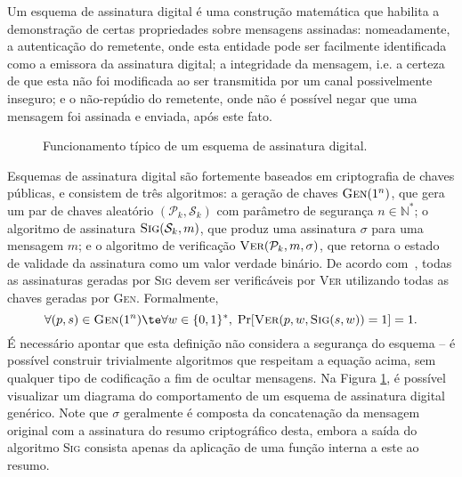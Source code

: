 \documentclass[12pt]{report}
\newcommand{\pk}{$\mathcal{P}_k$}
\newcommand{\sk}{$\mathcal{S}_k$}
\newcommand{\hash}[2][]{\mathcal{H}^{#1}(#2)}
\newcommand{\concat}{\, \vert \vert \,}
\begin{document}
Um esquema de assinatura digital é uma construção matemática que habilita a
demonstração de certas propriedades sobre mensagens assinadas: nomeadamente,
a autenticação do remetente, onde esta entidade pode ser facilmente
identificada como a emissora da assinatura digital; a integridade da mensagem,
i.e. a certeza de que esta não foi modificada ao ser transmitida por um canal
possivelmente inseguro; e o não-repúdio do remetente, onde não é possível negar
que uma mensagem foi assinada e enviada, após este fato.

\begin{figure}[ht]
  \centering
  \caption{Funcionamento típico de um esquema de assinatura digital.}
  \label{fig:2}
\end{figure}

Esquemas de assinatura digital são fortemente baseados em criptografia de
chaves públicas, e consistem de três algoritmos: a geração de chaves
$\textsc{Gen}(1^n)$, que gera um par de chaves aleatório $(\mathcal{P}_k,
\mathcal{S}_k)$ com parâmetro de segurança $n \in \mathbb{N}^{*}$; o algoritmo de assinatura
$\textsc{Sig}(\mathcal{S}_k, m)$, que produz uma assinatura $\sigma$ para uma
mensagem $m$; e o algoritmo de verificação $\textsc{Ver}(\mathcal{P}_k, m,
\sigma)$, que retorna o estado de validade da assinatura como um valor verdade
binário. De acordo com~\cite{Goldreich:2004:FCV:975541}, todas as assinaturas geradas por
\textsc{Sig} devem ser verificáveis por \textsc{Ver} utilizando todas as chaves
geradas por \textsc{Gen}. Formalmente,
\begin{equation}
\forall (p, s) \in \textsc{Gen}(1^n) \te\forall w \in \{0, 1\}^{*}, \;
    \text{Pr}[\textsc{Ver}(p, w, \textsc{Sig}(s, w)) = 1] = 1.
\end{equation}
É necessário apontar que esta definição não considera a segurança do esquema -- é possível construir trivialmente algoritmos que respeitam a equação acima, sem qualquer tipo de codificação a fim de ocultar mensagens. 
Na Figura \ref{fig:2}, é possível visualizar um diagrama do comportamento de
um esquema de assinatura digital genérico. Note que $\sigma$ geralmente é
composta da concatenação da mensagem original com a assinatura do resumo
criptográfico desta, embora a saída do algoritmo \textsc{Sig} consista apenas
da aplicação de uma função interna a este ao resumo.
\end{document}
